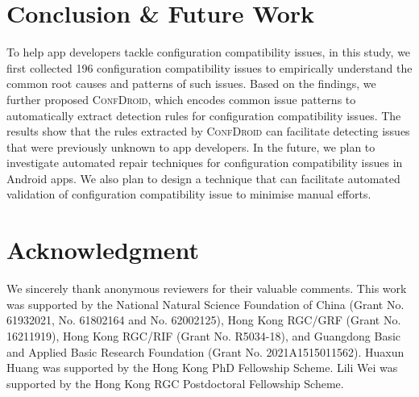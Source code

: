 \section{Conclusion \& Future Work}
To help app developers tackle configuration compatibility issues, in this study, we first collected 196 configuration compatibility issues to empirically understand the common root causes and patterns of such issues.
Based on the findings, we further proposed \textsc{ConfDroid}, which encodes common issue patterns to automatically extract detection rules for configuration compatibility issues.
The results show that the rules extracted by \textsc{ConfDroid} can facilitate detecting issues that were previously unknown to app developers.
In the future, we plan to investigate automated repair techniques for configuration compatibility issues in Android apps.
We also plan to design a technique that can facilitate automated validation of configuration compatibility issue to minimise manual efforts.

\section*{Acknowledgment}
We sincerely thank anonymous reviewers for their valuable comments.
This work was supported by the National Natural Science Foundation of China (Grant No. 61932021, No. 61802164 and No. 62002125), Hong Kong RGC/GRF (Grant No. 16211919), Hong Kong RGC/RIF (Grant No. R5034-18), and Guangdong Basic and Applied Basic Research Foundation (Grant No. 2021A1515011562). Huaxun Huang was supported by the Hong Kong PhD Fellowship Scheme. Lili Wei was supported by the Hong Kong RGC Postdoctoral Fellowship Scheme.
